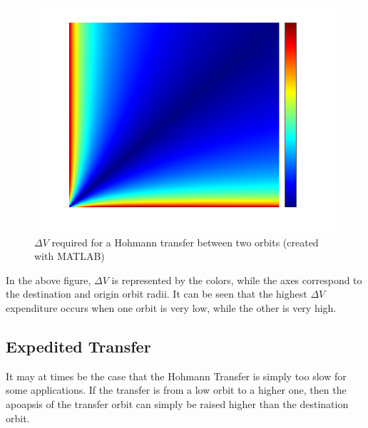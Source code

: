 \documentclass{article}
\begin{document}
\begin{figure}[H]
    \centering
    \includegraphics[scale=0.5]{DeltaVHeatmap.png}
    \caption{$\Delta V$ required for a Hohmann transfer between two orbits (created with MATLAB)}\label{fig:Delta V Heatmap}
\end{figure}

In the above figure, $\Delta V$ is represented by the colors, while the axes correspond to the destination and origin orbit radii. It can be seen that the highest $\Delta V$ expenditure occurs when one orbit is very low, while the other is very high.

\bigskip\bigskip
\subsection{Expedited Transfer}

It may at times be the case that the Hohmann Transfer is simply too slow for some applications. If the transfer is from a low orbit to a higher one, then the apoapsis of the transfer orbit can simply be raised higher than the destination orbit.
\end{document}
